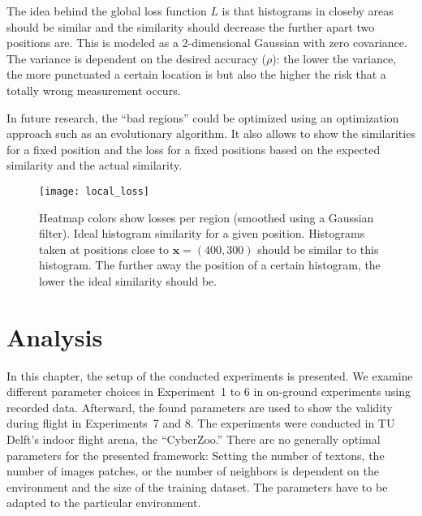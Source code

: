 The idea behind the global loss function $L$ is that histograms in
closeby areas should be similar and the similarity should decrease the
further apart two positions are. This is modeled as a 2-dimensional
Gaussian with zero covariance. The variance is dependent on the
desired accuracy ($\rho$): the lower the variance, the more punctuated
a certain location is but also the higher the risk that a totally
wrong measurement occurs.

In future research, the ``bad regions'' could be optimized using an
optimization approach such as an evolutionary algorithm. It also
allows to show the similarities for a fixed position and the loss for
a fixed positions based on the expected similarity and the actual
similarity.

\begin{figure}[h!]
\begin{center}
\texttt{[image: local\_loss]}
\caption{{Heatmap colors show losses per region (smoothed using a
    Gaussian filter). Ideal histogram similarity for a given
    position. Histograms taken at positions close to
    $\textbf{x} = (400, 300)$ should be similar to this histogram. The
    further away the position of a certain histogram, the lower the
    ideal similarity should be.%
  }}
\end{center}
\end{figure}

\chapter{Analysis}
\label{chap:analysis}

In this chapter, the setup of the conducted experiments is
presented. We examine different parameter choices in Experiment~1 to 6
in on-ground experiments using recorded data. Afterward, the found
parameters are used to show the validity during flight in
Experiments~7 and 8. The experiments were conducted in TU Delft's
indoor flight arena, the ``CyberZoo.''
%
There are no generally optimal parameters for the presented framework:
Setting the number of textons, the number of images patches, or the
number of neighbors is dependent on the environment and the size of the
training dataset. The parameters have to be adapted to the particular
environment.

